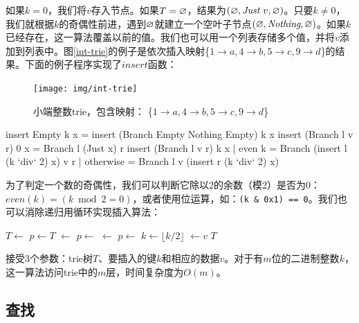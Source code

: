 \documentclass[b5paper]{ctexart}
\begin{document}
如果$k = 0$，我们将$v$存入节点。如果$T = \varnothing$，结果为$(\varnothing, \textit{Just}\ v, \varnothing)$。只要$k \neq 0$，我们就根据$k$的奇偶性前进，遇到$\varnothing$就建立一个空叶子节点$(\varnothing, \textit{Nothing}, \varnothing)$。如果$k$已经存在，这一算法覆盖以前的值。我们也可以用一个列表存储多个值，并将$v$添加到列表中。图\ref{int-trie}的例子是依次插入映射\{$ 1 \rightarrow a, 4 \rightarrow b, 5 \rightarrow c, 9 \rightarrow d$\}的结果。下面的例子程序实现了$insert$函数：

\begin{figure}[htbp]
  \centering
  \texttt{[image: img/int-trie]}
  \caption{小端整数trie，包含映射：
          \{$ 1 \rightarrow a, 4 \rightarrow b, 5 \rightarrow c, 9 \rightarrow d$\}}
  \label{fig:int-trie}
\end{figure}

\begin{Haskell}
insert Empty k x = insert (Branch Empty Nothing Empty) k x
insert (Branch l v r) 0 x = Branch l (Just x) r
insert (Branch l v r) k x | even k    = Branch (insert l (k `div` 2) x) v r
                          | otherwise = Branch l v (insert r (k `div` 2) x)
\end{Haskell}

为了判定一个数的奇偶性，我们可以判断它除以2的余数（模2）是否为0：$even(k) = (k \bmod 2 = 0)$，或者使用位运算，如：\texttt{(k \& 0x1) == 0}。我们也可以消除递归用循环实现插入算法：

\begin{algorithmic}[1]
    \State $T \gets$   
  \EndIf
  \State $p \gets T$
        \State {} $\gets$ 
      \EndIf
      \State $p \gets$ 
    \Else
        \State {} $\gets$ 
      \EndIf
      \State $p \gets$ 
    \EndIf
    \State $k \gets \lfloor k/2 \rfloor$
  \EndWhile
  \State {} $\gets v$
  \State \Return $T$
\EndFunction
\end{algorithmic}

接受3个参数：trie树$T$、要插入的键$k$和相应的数据$v$。对于有$m$位的二进制整数$k$，这一算法访问trie中的$m$层，时间复杂度为$O(m)$。

\subsection{查找}
\end{document}
